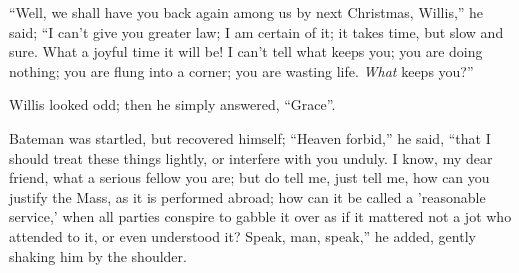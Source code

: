 ``Well, we shall have you back again among us by next
Christmas, Willis,'' he said; ``I can't give you greater law;
I am certain of it; it takes time, but slow and sure. What a joyful
time it will be! I can't tell what keeps you; you are doing nothing;
you are flung into a corner; you are wasting life. \emph{What} keeps
you?''

Willis looked odd; then he simply answered, ``Grace''.

Bateman was startled, but recovered himself; ``Heaven
forbid,'' he said, ``that I should treat these things lightly,
or interfere with you unduly. I know, my dear friend, what a serious
fellow you are; but do tell me, just tell me, how can you justify the
Mass, as it is performed abroad; how can it be called a 'reasonable
service,' when all parties conspire to gabble it over as if it
mattered not a jot who attended to it, or even understood it? Speak,
man, speak,'' he added, gently shaking him by the shoulder.

